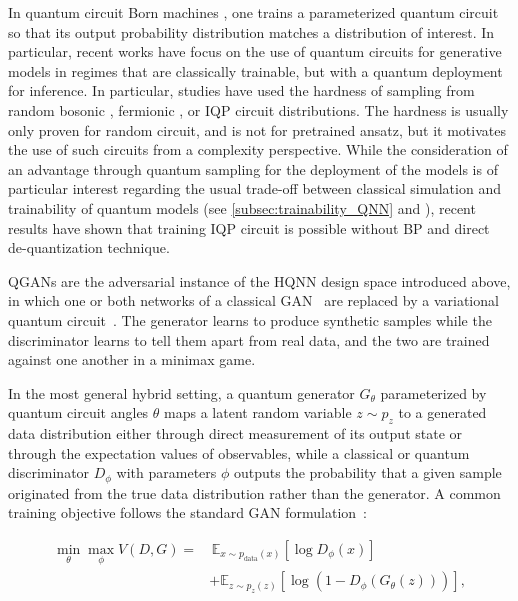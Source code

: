 \documentclass[aps,10pt,groupedaddress,prx,superscriptaddress,twocolumn,balancelastpage, tightenlines]{revtex4-2}
\theoremstyle{plain}  %
\begin{document}
In quantum circuit Born machines \cite{liu_differentiable_2018, coyle_born_2020, benedetti_generative_2019}, one trains a parameterized quantum circuit so that its output probability distribution matches a distribution of interest. In particular, recent works have focus on the use of quantum circuits for generative models in regimes that are classically trainable, but with a quantum deployment for inference. In particular, studies have used the hardness of sampling from random bosonic \cite{kolarovszki_generative_2026, gottlieb_efficient_2026}, fermionic \cite{bako_fermionic_2025, kerenidis_scalable_2026}, or \gls{IQP} \cite{kasture_protocols_2023, recio-armengol_train_2025} circuit distributions. The hardness is usually only proven for random circuit, and is not for pretrained ansatz, but it motivates the use of such circuits from a complexity perspective. While the consideration of an advantage through quantum sampling for the deployment of the models is of particular interest regarding the usual trade-off between classical simulation and trainability of quantum models (see \autoref{subsec:trainability_QNN} and \cite{cerezo_does_2025}), recent results have shown \cite{recio-armengol_train_2025, shen_characterizing_2026} that training \gls{IQP} circuit is possible without \gls{BP} and direct de-quantization technique.




\Glspl{QGAN} are the adversarial instance of the \gls{HQNN} design space introduced above, in which one
or both networks of a classical
\gls{GAN}~\cite{goodfellow2014gan, creswell_generative_2018} are replaced by a variational quantum circuit~\cite{lloyd2018quantum, dallaire2018quantum}. The generator learns to produce synthetic samples while the discriminator learns to tell them apart from real data, and the two are trained against one another in a minimax game.

In the most general hybrid setting, a quantum generator $G_\theta$
parameterized by quantum circuit angles $\theta$ maps a latent random
variable $z \sim p_z$ to a generated data distribution either through
direct measurement of its output state or through the expectation values
of observables, while a classical or quantum discriminator $D_\phi$
with parameters $\phi$ outputs the probability that a given sample
originated from the true data distribution rather than the generator.
A common training objective follows the standard \gls{GAN} formulation~\cite{goodfellow2014gan}:
 
\begin{equation}
\begin{split}
    \min_\theta \max_\phi V(D, G) = & \,\mathbb{E}_{x \sim p_{\text{data}}(x)}[\log D_\phi(x)] \\
     & + \mathbb{E}_{z \sim p_z(z)}[\log(1 - D_\phi(G_\theta(z)))],
\end{split}
\end{equation}
 
\end{document}
